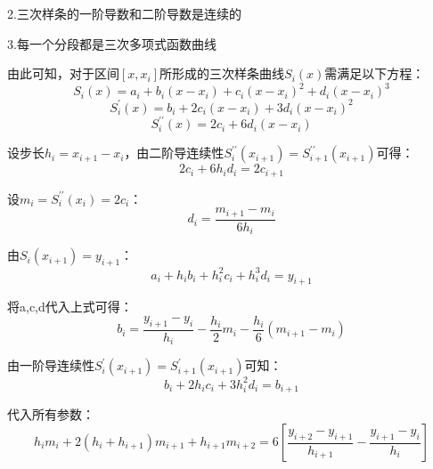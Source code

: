 \documentclass[type=master,oneside]{fduthesis}
\begin{document}
2.三次样条的一阶导数和二阶导数是连续的

3.每一个分段都是三次多项式函数曲线

由此可知，对于区间$[x,x_i]$所形成的三次样条曲线$S_i(x)$需满足以下方程：
\begin{equation}
  S_i(x) =a_i+b_i\left(x-x_i\right)+c_i\left(x-x_i\right)^2+d_i\left(x-x_i\right)^3
\end{equation}
\begin{equation}
  S_i^{\prime}(x) =b_i+2 c_i\left(x-x_i\right)+3 d_i\left(x-x_i\right)^2
\end{equation}
\begin{equation}
  S_i^{\prime \prime}(x) =2 c_i+6 d_i\left(x-x_i\right)
\end{equation}

设步长$h_i=x_{i+1}-x_i$，由二阶导连续性$S_i^{\prime \prime}\left(x_{i+1}\right)=S_{i+1}^{\prime \prime}\left(x_{i+1}\right)$可得：
\begin{equation}
  2 c_i+6 h_i d_i=2 c_{i+1}
\end{equation}

设$m_i=S_i^{\prime \prime}\left(x_i\right)=2 c_i$：
\begin{equation}
  d_i=\frac{m_{i+1}-m_i}{6 h_i}
\end{equation}

由$S_i\left(x_{i+1}\right)=y_{i+1}$：
\begin{equation}
  a_i+h_i b_i+h_i^2 c_i+h_i^3 d_i=y_{i+1}
\end{equation}

将a,c,d代入上式可得：
\begin{equation}
  b_i=\frac{y_{i+1}-y_i}{h_i}-\frac{h_i}{2} m_i-\frac{h_i}{6}\left(m_{i+1}-m_i\right)
\end{equation}

由一阶导连续性$S_i^{\prime}\left(x_{i+1}\right)=S_{i+1}^{\prime}\left(x_{i+1}\right)$可知：
\begin{equation}
  b_i+2 h_i c_i+3 h_i^2 d_i=b_{i+1}
\end{equation}

代入所有参数：
\begin{equation}
  h_i m_i+2\left(h_i+h_{i+1}\right) m_{i+1}+h_{i+1} m_{i+2}=6\left[\frac{y_{i+2}-y_{i+1}}{h_{i+1}}-\frac{y_{i+1}-y_i}{h_i}\right]
\end{equation}
\end{document}
